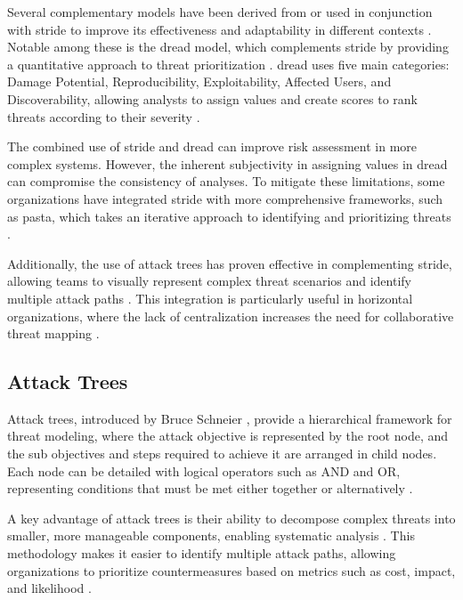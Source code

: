 Several complementary models have been derived from or used in conjunction with
\gls{stride} to improve its effectiveness and adaptability in different contexts
\cite{SoftwareandattackcentricThreatModeling}. Notable among these is the
\gls{dread} model, which complements \gls{stride} by providing a quantitative
approach to threat prioritization \cite{DREADful}. \gls{dread} uses five main
categories: Damage Potential, Reproducibility, Exploitability, Affected Users,
and Discoverability, allowing analysts to assign values and create scores to
rank threats according to their severity
\cite{SoftwareandattackcentricThreatModeling, DREADful}.

The combined use of \gls{stride} and \gls{dread} can improve risk assessment in
more complex systems. However, the inherent subjectivity in assigning values
in \gls{dread} can compromise the consistency of \cite{DREADful} analyses. To
mitigate these limitations, some organizations have integrated \gls{stride} with
more comprehensive frameworks, such as \gls{pasta}, which takes an iterative
approach to identifying and prioritizing threats
\cite{SoftwareandattackcentricThreatModeling}.

Additionally, the use of attack trees has proven effective in complementing
\gls{stride}, allowing teams to visually represent complex threat scenarios and
identify multiple attack paths \cite{FoundationsofAttackTrees}. This integration
is particularly useful in horizontal organizations, where the lack of
centralization increases the need for collaborative threat mapping
\cite{ThreatModelingdesigningForSecurity}.

\subsection{Attack Trees}
\label{subsec:attack_trees}

Attack trees, introduced by Bruce Schneier \cite{AttackTrees}, provide a
hierarchical framework for threat modeling, where the attack objective is
represented by the root node, and the sub objectives and steps required to
achieve it are arranged in child nodes. Each node can be detailed with logical
operators such as AND and OR, representing conditions that must be met either
together or alternatively \cite{FoundationsofAttackTrees}.

A key advantage of attack trees is their ability to decompose complex threats
into smaller, more manageable components, enabling systematic analysis
\cite{Energytheftdetectionissues}. This methodology makes it easier to identify
multiple attack paths, allowing organizations to prioritize countermeasures
based on metrics such as cost, impact, and likelihood
\cite{AnAttackTreeBasedRisk}.

